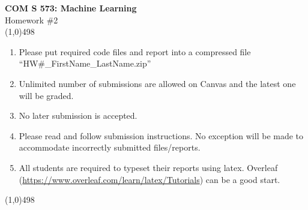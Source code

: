 \documentclass[11pt]{article}
\begin{document}
\begin{center}
{\Large \textbf{COM S 573: Machine Learning}\\Homework \#2}\\

\linethickness{1mm}\line(1,0){498}

\begin{enumerate}
\item Please put required code files and report into a
compressed file ``HW\#\_FirstName\_LastName.zip''
\item Unlimited number of submissions are
allowed on Canvas and the latest one will be graded.
\item {\color{red} No later submission is accepted.}
\item Please read and follow submission instructions. No exception
will be made to accommodate incorrectly submitted files/reports.
\item All students are required to typeset their reports using
latex. Overleaf
(\url{https://www.overleaf.com/learn/latex/Tutorials}) can be a
good start.
\end{enumerate}

\linethickness{1mm}\line(1,0){498}

\end{center}


\end{document}
